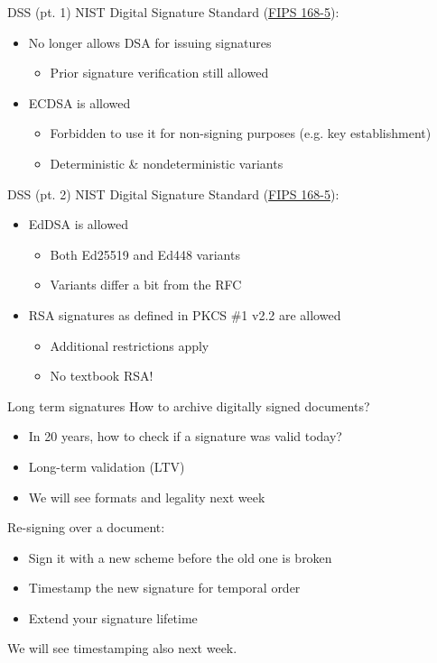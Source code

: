 \begin{frame}{DSS (pt. 1)}
  NIST Digital Signature Standard (\href{https://csrc.nist.gov/pubs/fips/186-5/final}{FIPS 168-5}):
  \begin{itemize}[<+(1)->]
    \item No longer allows DSA for issuing signatures
    \begin{itemize}
      \item Prior signature verification still allowed
    \end{itemize}
    \item ECDSA is allowed
    \begin{itemize}
      \item Forbidden to use it for non-signing purposes (e.g. key establishment)
      \item Deterministic \& nondeterministic variants
    \end{itemize}
  \end{itemize}
\end{frame}

\begin{frame}{DSS (pt. 2)}
  NIST Digital Signature Standard (\href{https://csrc.nist.gov/pubs/fips/186-5/final}{FIPS 168-5}):
  \begin{itemize}[<+(1)->]
    \item EdDSA is allowed
    \begin{itemize}
      \item Both Ed25519 and Ed448 variants
      \item Variants differ a bit from the RFC
    \end{itemize}
    \item RSA signatures as defined in PKCS \#1 v2.2 are allowed
    \begin{itemize}
      \item Additional restrictions apply
      \item No textbook RSA!
    \end{itemize}
  \end{itemize}
\end{frame}

\begin{frame}{Long term signatures}
  How to archive digitally signed documents?
  \begin{itemize}[<+(1)->]
    \item In 20 years, how to check if a signature was valid today?
    \item Long-term validation (LTV)
    \item We will see formats and legality next week
  \end{itemize}

  \pause
  Re-signing over a document:
  \begin{itemize}[<+(1)->]
    \item Sign it with a new scheme before the old one is broken
    \item Timestamp the new signature for temporal order
    \item Extend your signature lifetime
  \end{itemize}

  \pause
  We will see timestamping also next week.
\end{frame}

